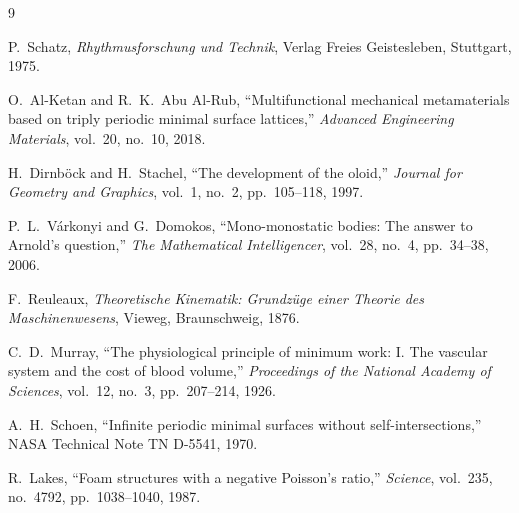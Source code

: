 \documentclass[11pt,a4paper]{article}
\begin{document}
\begin{thebibliography}{9}

P.~Schatz, \emph{Rhythmusforschung und Technik}, Verlag Freies
Geistesleben, Stuttgart, 1975.

O.~Al-Ketan and R.~K.~Abu Al-Rub, ``Multifunctional mechanical
metamaterials based on triply periodic minimal surface lattices,''
\emph{Advanced Engineering Materials}, vol.~20, no.~10, 2018.

H.~Dirnb{\"o}ck and H.~Stachel, ``The development of the oloid,''
\emph{Journal for Geometry and Graphics}, vol.~1, no.~2, pp.~105--118,
1997.

P.~L.~V{\'a}rkonyi and G.~Domokos, ``Mono-monostatic bodies: The
answer to Arnold's question,'' \emph{The Mathematical Intelligencer},
vol.~28, no.~4, pp.~34--38, 2006.

F.~Reuleaux, \emph{Theoretische Kinematik: Grundz{\"u}ge einer
Theorie des Maschinenwesens}, Vieweg, Braunschweig, 1876.

C.~D.~Murray, ``The physiological principle of minimum work: I. The
vascular system and the cost of blood volume,'' \emph{Proceedings of
the National Academy of Sciences}, vol.~12, no.~3, pp.~207--214, 1926.

A.~H.~Schoen, ``Infinite periodic minimal surfaces without
self-intersections,'' NASA Technical Note TN D-5541, 1970.

R.~Lakes, ``Foam structures with a negative Poisson's ratio,''
\emph{Science}, vol.~235, no.~4792, pp.~1038--1040, 1987.

\end{thebibliography}
\end{document}

